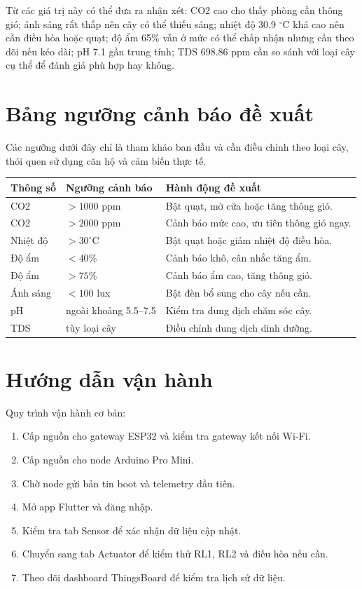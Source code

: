 Từ các giá trị này có thể đưa ra nhận xét: CO2 cao cho thấy phòng cần thông gió; ánh sáng rất thấp nên cây có thể thiếu sáng; nhiệt độ 30.9 $^\circ$C khá cao nên cần điều hòa hoặc quạt; độ ẩm 65\% vẫn ở mức có thể chấp nhận nhưng cần theo dõi nếu kéo dài; pH 7.1 gần trung tính; TDS 698.86 ppm cần so sánh với loại cây cụ thể để đánh giá phù hợp hay không.

\section{Bảng ngưỡng cảnh báo đề xuất}
Các ngưỡng dưới đây chỉ là tham khảo ban đầu và cần điều chỉnh theo loại cây, thói quen sử dụng căn hộ và cảm biến thực tế.

\begin{longtable}{|p{3.2cm}|p{3cm}|p{6.5cm}|}
\hline
\textbf{Thông số} & \textbf{Ngưỡng cảnh báo} & \textbf{Hành động đề xuất} \\
\hline
CO2 & $>1000$ ppm & Bật quạt, mở cửa hoặc tăng thông gió. \\
\hline
CO2 & $>2000$ ppm & Cảnh báo mức cao, ưu tiên thông gió ngay. \\
\hline
Nhiệt độ & $>30^\circ$C & Bật quạt hoặc giảm nhiệt độ điều hòa. \\
\hline
Độ ẩm & $<40\%$ & Cảnh báo khô, cân nhắc tăng ẩm. \\
\hline
Độ ẩm & $>75\%$ & Cảnh báo ẩm cao, tăng thông gió. \\
\hline
Ánh sáng & $<100$ lux & Bật đèn bổ sung cho cây nếu cần. \\
\hline
pH & ngoài khoảng 5.5--7.5 & Kiểm tra dung dịch chăm sóc cây. \\
\hline
TDS & tùy loại cây & Điều chỉnh dung dịch dinh dưỡng. \\
\hline
\end{longtable}

\section{Hướng dẫn vận hành}
Quy trình vận hành cơ bản:
\begin{enumerate}
    \item Cấp nguồn cho gateway ESP32 và kiểm tra gateway kết nối Wi-Fi.
    \item Cấp nguồn cho node Arduino Pro Mini.
    \item Chờ node gửi bản tin boot và telemetry đầu tiên.
    \item Mở app Flutter và đăng nhập.
    \item Kiểm tra tab Sensor để xác nhận dữ liệu cập nhật.
    \item Chuyển sang tab Actuator để kiểm thử RL1, RL2 và điều hòa nếu cần.
    \item Theo dõi dashboard ThingsBoard để kiểm tra lịch sử dữ liệu.
\end{enumerate}

